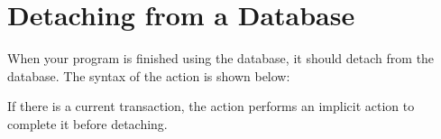 \section{Detaching from a Database}
 
When your program is finished using the database, it should detach
from the database. The syntax of the  action is shown below:

\begin{quote}
\end{quote}

If there is a current transaction, the  action performs an
implicit  action to complete it before detaching.

